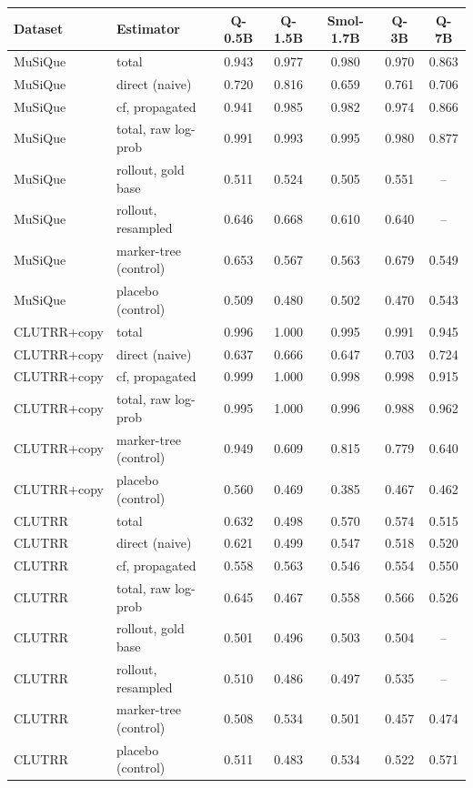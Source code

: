 \begin{tabular}{llccccc}
\toprule
Dataset & Estimator & Q-0.5B & Q-1.5B & Smol-1.7B & Q-3B & Q-7B \\
\midrule
MuSiQue & total & 0.943 & 0.977 & 0.980 & 0.970 & 0.863 \\
MuSiQue & direct (naive) & 0.720 & 0.816 & 0.659 & 0.761 & 0.706 \\
MuSiQue & cf, propagated & 0.941 & 0.985 & 0.982 & 0.974 & 0.866 \\
MuSiQue & total, raw log-prob & 0.991 & 0.993 & 0.995 & 0.980 & 0.877 \\
MuSiQue & rollout, gold base & 0.511 & 0.524 & 0.505 & 0.551 & -- \\
MuSiQue & rollout, resampled & 0.646 & 0.668 & 0.610 & 0.640 & -- \\
MuSiQue & marker-tree (control) & 0.653 & 0.567 & 0.563 & 0.679 & 0.549 \\
MuSiQue & placebo (control) & 0.509 & 0.480 & 0.502 & 0.470 & 0.543 \\
\midrule
CLUTRR+copy & total & 0.996 & 1.000 & 0.995 & 0.991 & 0.945 \\
CLUTRR+copy & direct (naive) & 0.637 & 0.666 & 0.647 & 0.703 & 0.724 \\
CLUTRR+copy & cf, propagated & 0.999 & 1.000 & 0.998 & 0.998 & 0.915 \\
CLUTRR+copy & total, raw log-prob & 0.995 & 1.000 & 0.996 & 0.988 & 0.962 \\
CLUTRR+copy & marker-tree (control) & 0.949 & 0.609 & 0.815 & 0.779 & 0.640 \\
CLUTRR+copy & placebo (control) & 0.560 & 0.469 & 0.385 & 0.467 & 0.462 \\
\midrule
CLUTRR & total & 0.632 & 0.498 & 0.570 & 0.574 & 0.515 \\
CLUTRR & direct (naive) & 0.621 & 0.499 & 0.547 & 0.518 & 0.520 \\
CLUTRR & cf, propagated & 0.558 & 0.563 & 0.546 & 0.554 & 0.550 \\
CLUTRR & total, raw log-prob & 0.645 & 0.467 & 0.558 & 0.566 & 0.526 \\
CLUTRR & rollout, gold base & 0.501 & 0.496 & 0.503 & 0.504 & -- \\
CLUTRR & rollout, resampled & 0.510 & 0.486 & 0.497 & 0.535 & -- \\
CLUTRR & marker-tree (control) & 0.508 & 0.534 & 0.501 & 0.457 & 0.474 \\
CLUTRR & placebo (control) & 0.511 & 0.483 & 0.534 & 0.522 & 0.571 \\
\bottomrule
\end{tabular}
